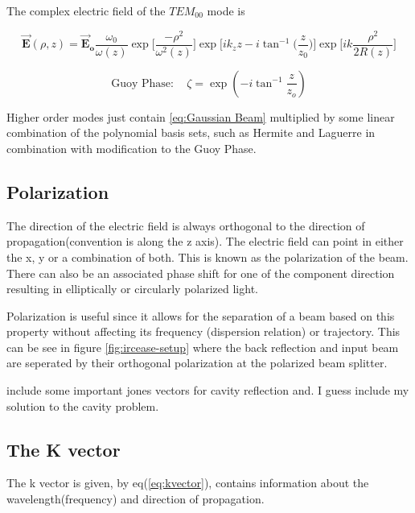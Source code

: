 \documentclass[11pt,a4paper]{book}
\begin{document}
			The complex electric field of the $TEM_{00}$ mode is 
			
			\begin{equation}
				\label {eq:Gaussian Beam}
				\vec{\textbf{E}}(\rho,z)=\vec{\textbf{E}}_\textbf{o} \frac{\omega_{0}}{\omega(z)} \exp\bigg[\dfrac{-\rho^2}{\omega^2(z)}\bigg] \exp\bigg[ik_z z - i \tan^{-1}\bigg(\frac{z}{z_0}\bigg)\bigg]\exp\bigg[ik \dfrac{\rho^2}{2R(z)}\bigg]
			\end{equation}
			
			\begin{equation}
				\label {eq:Guoy Phase}
				\text{Guoy Phase}:\quad \zeta = \exp\left(-i\tan^{-1}{\dfrac{z}{z_o}}\right)
			\end{equation}
			
			\noindent
			Higher order modes just contain \autoref{eq:Gaussian Beam} multiplied by some linear combination of the polynomial basis sets, such as Hermite and Laguerre in combination with modification to the Guoy Phase.
		
		\subsection{Polarization}
			\label{subsec:Polarization}
			The direction of the electric field is always orthogonal to the direction of propagation(convention is along the z axis). The electric field can point in either the x, y or a combination of both. This is known as the polarization of the beam. There can also be an associated phase shift for one of the component direction resulting in elliptically or circularly polarized light.
			
			Polarization is useful since it allows for the separation of a beam based on this property without affecting its frequency (dispersion relation) or trajectory. This can be see in figure \autoref{fig:ircease-setup} where the back reflection and input beam are seperated by their orthogonal polarization at the polarized beam splitter.
			
			include some important jones vectors for cavity reflection and. I guess include my solution to the cavity problem.
		\subsection{The K vector}
			\label{subsec:The K vector}
			The k vector is given, by eq(\autoref{eq:kvector}), contains information about the wavelength(frequency) and direction of propagation.
			
\end{document}
